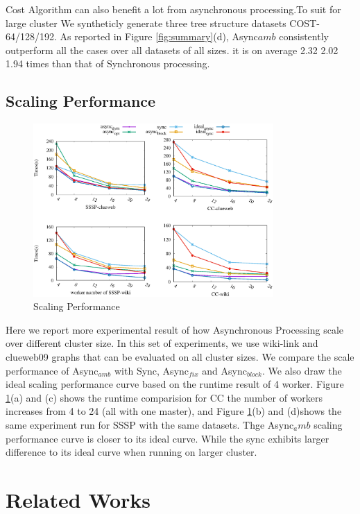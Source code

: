 {\color{blue}
	 Cost Algorithm can also benefit a lot from asynchronous processing.To suit for large cluster We syntheticly generate three tree structure datasets COST-64/128/192. As reported in Figure \ref{fig:summary}(d), Async$amb$ consistently outperform all the cases over all datasets of all sizes. it is on average 2.32 2.02 1.94 times than that of Synchronous processing.
	
}
\subsection{Scaling Performance}
\begin{figure}[!t]
	\vspace{-0.1in}
	\hspace{-0.3in}
	\includegraphics[width=3.6in]{figuration/scale.eps}
	\caption{Scaling Performance}
	\label{fig:scale}
	\vspace{-0.2in}
\end{figure}

Here we report more experimental result of how Asynchronous Processing scale over different cluster size. 
In this set of experiments, we use wiki-link and clueweb09 graphs that can be evaluated on all cluster sizes.
We compare the scale performance of Async$_{amb}$ with Sync, Async$_{fix}$ and Async$_{block}$. We also draw the ideal scaling performance curve based on the runtime result of 4 worker.  Figure \ref{fig:scale}(a) and (c) shows the runtime comparision for CC the number of workers increases from 4 to 24 (all with one master), and Figure \ref{fig:scale}(b) and (d)shows the same experiment run for SSSP with the same datasets.
Thge Async$_amb$ scaling performance curve is closer to its ideal curve. While the sync exhibits larger difference to its ideal curve  when running on larger cluster.  

\section{Related Works}
\label{sec:related}

